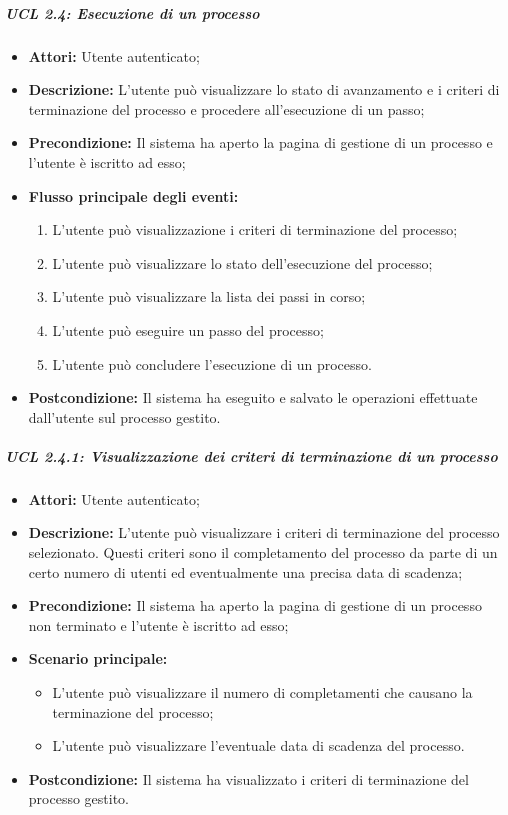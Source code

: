\subparagraph{UCL 2.4: Esecuzione di un processo}
\begin{itemize}
\item \textbf{Attori:} Utente autenticato;
\item \textbf{Descrizione:} L'utente può visualizzare lo stato di avanzamento e i criteri di terminazione del processo e procedere all'esecuzione di un passo;
\item \textbf{Precondizione:} Il sistema ha aperto la pagina di gestione di un processo e l'utente è iscritto ad esso;
\item \textbf{Flusso principale degli eventi:}
\begin{enumerate}
\item L'utente può visualizzazione i criteri di terminazione del processo;
\item L'utente può visualizzare lo stato dell'esecuzione del processo;
\item L'utente può visualizzare la lista dei passi in corso;
\item L'utente può eseguire un passo del processo;
\item L'utente può concludere l'esecuzione di un processo.
\end{enumerate} 
\item \textbf{Postcondizione:} Il sistema ha eseguito e salvato le operazioni effettuate dall'utente sul processo gestito.
\end{itemize}

\subparagraph{UCL 2.4.1: Visualizzazione dei criteri di terminazione di un processo}
\begin{itemize}
\item \textbf{Attori:} Utente autenticato;
\item \textbf{Descrizione:} L'utente può visualizzare i criteri di terminazione del processo selezionato. Questi criteri sono il completamento del processo da parte di un certo numero di utenti ed eventualmente una precisa data di scadenza;
\item \textbf{Precondizione:} Il sistema ha aperto la pagina di gestione di un processo non terminato e l'utente è iscritto ad esso;
\item \textbf{Scenario principale:}
\begin{itemize}
\item L'utente può visualizzare il numero di completamenti che causano la terminazione del processo;
\item L'utente può visualizzare l'eventuale data di scadenza del processo.
\end{itemize}
\item \textbf{Postcondizione:} Il sistema ha visualizzato i criteri di terminazione del processo gestito.
\end{itemize}

